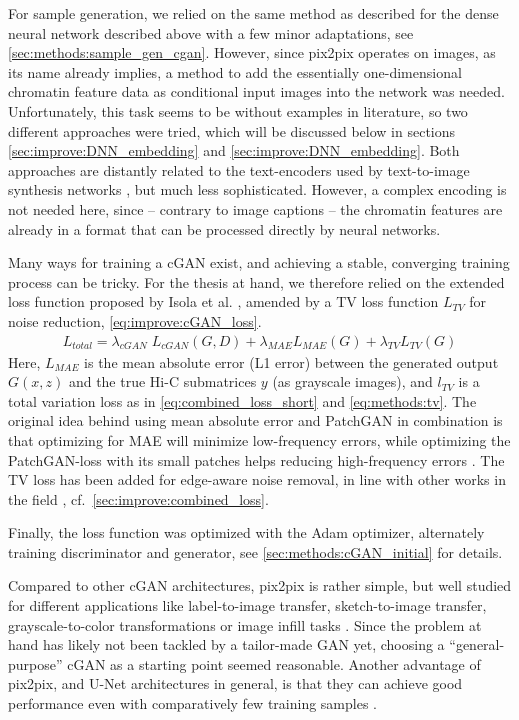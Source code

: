 For sample generation, we relied on the same method as described for the dense neural network described above
with a few minor adaptations, see \cref{sec:methods:sample_gen_cgan}.
However, since pix2pix operates on images, as its name already implies, 
a method to add the essentially one-dimensional chromatin feature data as conditional input images into the network was needed.
Unfortunately, this task seems to be without examples in literature, so two different approaches were tried,
which will be discussed below in sections \ref{sec:improve:DNN_embedding} and \ref{sec:improve:DNN_embedding}.
Both approaches are distantly related to the text-encoders used by text-to-image synthesis networks 
\cite{Reed2016b,Xu2018}, but much less sophisticated. 
However, a complex encoding is not needed here, since -- contrary to image captions -- the chromatin features are already in a format that can be processed directly by neural networks.

Many ways for training a cGAN exist, and achieving a stable, converging training process can be tricky.
For the thesis at hand, we therefore relied on the  extended loss function proposed by Isola et al. \cite{Isola2017}, 
amended by a TV loss function $L_\mathit{TV}$ for noise reduction, \cref{eq:improve:cGAN_loss}.
\begin{align}
 L_\mathit{total} = \lambda_\mathit{cGAN} \; L_\mathit{cGAN}(G,D) + \lambda_\mathit{MAE}L_\mathit{MAE}(G) + \lambda_\mathit{TV}L_\mathit{TV}(G) \label{eq:improve:cGAN_loss}
\end{align}
Here, $L_\mathit{MAE}$ is the mean absolute error (L1 error) between the generated output $G(x,z)$ and the true Hi-C submatrices $y$ (as grayscale images), 
and $l_\mathit{TV}$ is a total variation loss as in \cref{eq:combined_loss_short} and \cref{eq:methods:tv}.
The original idea behind using mean absolute error and PatchGAN in combination is that optimizing for MAE 
will minimize low-frequency errors, while optimizing the PatchGAN-loss with its small patches helps reducing high-frequency errors \cite{Isola2017}.
The TV loss has been added for edge-aware noise removal, in line with other works in the field \cite{Hong2020}, cf.~\cref{sec:improve:combined_loss}.

Finally, the loss function was optimized with the Adam optimizer,
alternately training discriminator and generator,
see \cref{sec:methods:cGAN_initial} for details.

Compared to other cGAN architectures, pix2pix is rather simple, but well studied for different applications like label-to-image transfer,
sketch-to-image transfer, grayscale-to-color transformations or image infill tasks \cite{Isola2017}.
Since the problem at hand has likely not been tackled by a tailor-made GAN yet, 
choosing a ``general-purpose'' cGAN as a starting point seemed reasonable.
Another advantage of pix2pix, and U-Net architectures in general, 
is that they can achieve good performance even with comparatively few training samples \cite{Isola2017, Ronneberger2015}.


